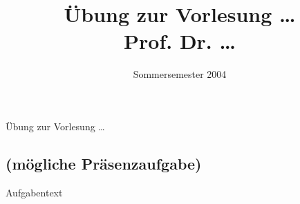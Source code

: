 \documentclass[
	colorbacktitle,
	accentcolor=0b,
	compat=true]{tudaexercise}
\title{Übung zur Vorlesung \ldots\\ Prof. Dr. \ldots}
\subtitle{Sommersemester 2004}
\let\textmb\textmd
\begin{document}
\begin{examheader}
	\textmb{Übung zur Vorlesung \ldots}
	\examheaderdefault
\end{examheader}


\setcounter{section}{9}

\maketitle

\subsection{(mögliche Präsenzaufgabe)}
Aufgabentext
\end{document}
